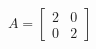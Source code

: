 \documentclass[preview]{standalone}
\begin{document}
\begin{align*}
A = \begin{bmatrix} 2 & 0 \\ 0 & 2 \end{bmatrix}
\end{align*}
\end{document}
